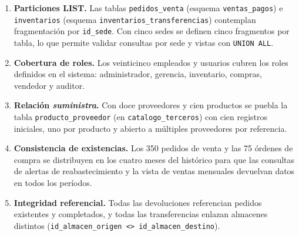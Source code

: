 \documentclass[11pt,oneside]{article}
\begin{document}
\begin{enumerate}[leftmargin=1.5em, itemsep=3pt]
  \item \textbf{Particiones LIST.} Las tablas \texttt{pedidos\_venta} (esquema
        \texttt{ventas\_pagos}) e \texttt{inventarios} (esquema
        \texttt{inventarios\_\allowbreak transferencias}) contemplan fragmentaci\'on por
        \texttt{id\_sede}. Con cinco sedes se definen cinco fragmentos por tabla,
        lo que permite validar consultas por sede y vistas con \texttt{UNION ALL}.

  \item \textbf{Cobertura de roles.} Los veinticinco empleados y usuarios cubren los
        roles definidos en el sistema: administrador, gerencia, inventario, compras,
        vendedor y auditor.

  \item \textbf{Relaci\'on \textit{suministra}.} Con doce proveedores y cien
        productos se puebla la tabla \texttt{producto\_proveedor} (en
        \texttt{catalogo\_terceros}) con cien registros iniciales, uno por
        producto y abierto a m\'ultiples proveedores por referencia.

  \item \textbf{Consistencia de existencias.} Los 350 pedidos de venta y las 75
        \'ordenes de compra se distribuyen en los cuatro meses del hist\'orico
        para que las consultas de alertas de reabastecimiento y la vista de
        ventas mensuales devuelvan datos en todos los per\'iodos.

  \item \textbf{Integridad referencial.} Todas las devoluciones referencian
        pedidos existentes y completados, y todas las transferencias enlazan
        almacenes distintos (\texttt{id\_almacen\_origen <> id\_almacen\_destino}).
\end{enumerate}
\end{document}
